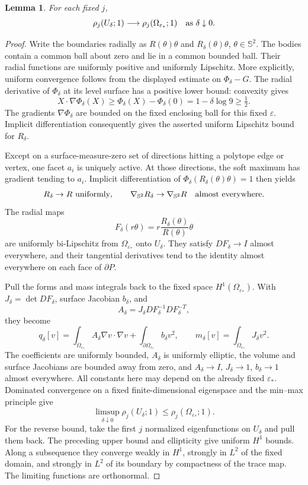 \documentclass[11pt,a4paper]{article}
\newtheorem{lemma}[theorem]{Lemma}
\theoremstyle{remark}
\newcommand{\eps}{\varepsilon}
\begin{document}
\begin{lemma}\label{lem:smoothing-spectrum}
For each fixed $j$,
\[
 \rho_j(U_\delta;1)\longrightarrow\rho_j(\Omega_{\eps_*};1)
 \quad\hbox{as }\delta\downarrow0.
\]
\end{lemma}
\begin{proof}
Write the boundaries radially as $R(\theta)\theta$ and $R_\delta(\theta)\theta$, $\theta\in\mathbb S^2$. The bodies contain a common ball about zero and lie in a common bounded ball. Their radial functions are uniformly positive and uniformly Lipschitz. More explicitly, uniform convergence follows from the displayed estimate on $\Phi_\delta-G$. The radial derivative of $\Phi_\delta$ at its level surface has a positive lower bound: convexity gives
\[
 X\cdot\nabla\Phi_\delta(X)\ge\Phi_\delta(X)-\Phi_\delta(0)
 =1-\delta\log9\ge\tfrac12.
\]
The gradients $\nabla\Phi_\delta$ are bounded on the fixed enclosing ball for this fixed $\eps$. Implicit differentiation consequently gives the asserted uniform Lipschitz bound for $R_\delta$.

Except on a surface-measure-zero set of directions hitting a polytope edge or vertex, one facet $a_i$ is uniquely active. At those directions, the soft maximum has gradient tending to $a_i$. Implicit differentiation of
$\Phi_\delta(R_\delta(\theta)\theta)=1$ then yields
\[
 R_\delta\to R\ \hbox{uniformly},\qquad
 \nabla_{\mathbb S^2}R_\delta\to\nabla_{\mathbb S^2}R
 \quad\hbox{almost everywhere}.
\]
The radial maps
\[
 F_\delta(r\theta)=r\frac{R_\delta(\theta)}{R(\theta)}\theta
\]
are uniformly bi-Lipschitz from $\Omega_{\eps_*}$ onto $U_\delta$. They satisfy $DF_\delta\to I$ almost everywhere, and their tangential derivatives tend to the identity almost everywhere on each face of $\partial P$.

Pull the forms and mass integrals back to the fixed space $H^1(\Omega_{\eps_*})$. With $J_\delta=\det DF_\delta$, surface Jacobian $b_\delta$, and
\[
 A_\delta=J_\delta DF_\delta^{-1}DF_\delta^{-T},
\]
they become
\[
 q_\delta[v]=\int_{\Omega_{\eps_*}}A_\delta\nabla v\cdot\nabla v
     +\int_{\partial\Omega_{\eps_*}}b_\delta v^2,
 \qquad m_\delta[v]=\int_{\Omega_{\eps_*}}J_\delta v^2.
\]
The coefficients are uniformly bounded, $A_\delta$ is uniformly elliptic, the volume and surface Jacobians are bounded away from zero, and
$A_\delta\to I$, $J_\delta\to1$, $b_\delta\to1$ almost everywhere. All constants here may depend on the already fixed $\eps_*$. Dominated convergence on a fixed finite-dimensional eigenspace and the min--max principle give
\[
 \limsup_{\delta\downarrow0}\rho_j(U_\delta;1)
 \le\rho_j(\Omega_{\eps_*};1).
\]
For the reverse bound, take the first $j$ normalized eigenfunctions on $U_\delta$ and pull them back. The preceding upper bound and ellipticity give uniform $H^1$ bounds. Along a subsequence they converge weakly in $H^1$, strongly in $L^2$ of the fixed domain, and strongly in $L^2$ of its boundary by compactness of the trace map. The limiting functions are orthonormal.


\end{proof}
\end{document}
